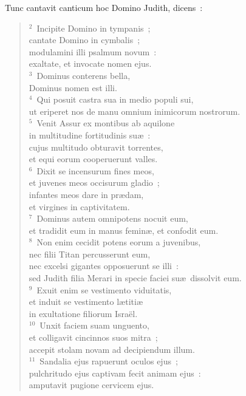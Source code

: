 \bchapter
\lettrine[lines=3,image=true,loversize=0.05,lraise=-0.03]{T}{}unc cantavit canticum hoc Domino Judith, dicens~:
\begin{flushleft}\begin{verse}\vspace{6pt}${}^{2}$~Incipite Domino in tympanis~;\\ cantate Domino in cymbalis~;\\ modulamini illi psalmum novum~:\\ exaltate, et invocate nomen ejus.\\
${}^{3}$~Dominus conterens bella,\\ Dominus nomen est illi.\\
${}^{4}$~Qui posuit castra sua in medio populi sui,\\ ut eriperet nos de manu omnium inimicorum nostrorum.\\
${}^{5}$~Venit Assur ex montibus ab aquilone\\ in multitudine fortitudinis su\ae~:\\ cujus multitudo obturavit torrentes,\\ et equi eorum cooperuerunt valles.\\
${}^{6}$~Dixit se incensurum fines meos,\\ et juvenes meos occisurum gladio~;\\ infantes meos dare in pr\ae dam,\\ et virgines in captivitatem.\\
${}^{7}$~Dominus autem omnipotens nocuit eum,\\ et tradidit eum in manus femin\ae , et confodit eum.\\
${}^{8}$~Non enim cecidit potens eorum a juvenibus,\\ nec filii Titan percusserunt eum,\\ nec excelsi gigantes opposuerunt se illi~:\\ sed Judith filia Merari in specie faciei su\ae\ dissolvit eum.\\
${}^{9}$~Exuit enim se vestimento viduitatis,\\ et induit se vestimento l\ae titi\ae \\ in exultatione filiorum Isra\"el.\\
${}^{10}$~Unxit faciem suam unguento,\\ et colligavit cincinnos suos mitra~;\\ accepit stolam novam ad decipiendum illum.\\
${}^{11}$~Sandalia ejus rapuerunt oculos ejus~;\\ pulchritudo ejus captivam fecit animam ejus~:\\ amputavit pugione cervicem ejus.\\

\end{verse}
\end{flushleft}
